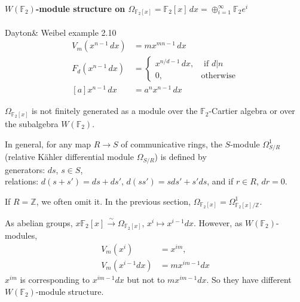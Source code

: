 \paragraph{$W(\mathbb{F}_2)$-module structure on $\Omega_{\mathbb{F}_2[x]}=\mathbb{F}_2[x]\,dx = \oplus_{i=1}^\infty \mathbb{F}_2 e^i$} Dayton\& Weibel \cite{MR96j:16008}example 2.10
\begin{align*}
 V_m(x^{n-1}\,dx)&=mx^{mn-1}\,dx\\
 F_d(x^{n-1}\,dx)&=\begin{cases}
 	x^{n/d-1}\,dx,& \mbox{ if $d|n$}\\
 	0,& \mbox{otherwise}
 \end{cases}\\
 [a]x^{n-1}\,dx&=a^nx^{n-1}\,dx
 \end{align*}
 \begin{remark}
 	$\Omega_{\mathbb{F}_2[x]}$ is {\color{red}not} finitely generated as a module over the $\mathbb{F}_2$-Cartier algebra or over the subalgebra $W(\mathbb{F}_2)$.
 \end{remark}

 In general, for any map $R\longrightarrow S$ of communicative rings, the $S$-module $\Omega_{S/R}^1$(relative K{\"{a}}hler differential module $\Omega_{S/R}$) is defined by \\
 generators: $ds$, $s\in S$,\\
 relations: $d(s+s')=ds+ds'$, $d(ss')=sds'+s'ds$, and if $r\in R$, $dr=0$.\\

\begin{remark}
	If $R=\mathbb{Z}$, we often omit it. In the previous section, $\Omega_{\mathbb{F}_2[x]}=\Omega_{\mathbb{F}_2[x]/\mathbb{Z}}^1$.
\end{remark}

As abelian groups, $x \mathbb{F}_2[x] \overset{\sim}\longrightarrow \Omega_{\mathbb{F}_2[x]}$, $x^i \mapsto x^{i-1}dx$. However, as $W(\mathbb{F}_2)$-modules,
\begin{align*}
V_m(x^i)&=x^{im},\\
V_m(x^{i-1}dx)&=mx^{im-1}dx
\end{align*}
$x^{im}$ is corresponding to $x^{im-1}dx$ but not to $mx^{im-1}dx$. So they have different $W(\mathbb{F}_2)$-module structure.

